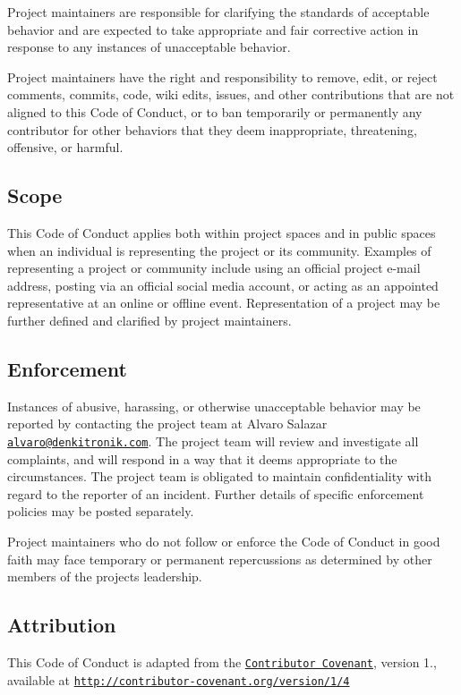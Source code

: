 Project maintainers are responsible for clarifying the standards of acceptable behavior and are expected to take appropriate and fair corrective action in response to any instances of unacceptable behavior.

Project maintainers have the right and responsibility to remove, edit, or reject comments, commits, code, wiki edits, issues, and other contributions that are not aligned to this Code of Conduct, or to ban temporarily or permanently any contributor for other behaviors that they deem inappropriate, threatening, offensive, or harmful.

\subsection*{Scope}

This Code of Conduct applies both within project spaces and in public spaces when an individual is representing the project or its community. Examples of representing a project or community include using an official project e-\/mail address, posting via an official social media account, or acting as an appointed representative at an online or offline event. Representation of a project may be further defined and clarified by project maintainers.

\subsection*{Enforcement}

Instances of abusive, harassing, or otherwise unacceptable behavior may be reported by contacting the project team at Alvaro Salazar \href{mailto:alvaro@denkitronik.com}{\tt alvaro@denkitronik.\+com}. The project team will review and investigate all complaints, and will respond in a way that it deems appropriate to the circumstances. The project team is obligated to maintain confidentiality with regard to the reporter of an incident. Further details of specific enforcement policies may be posted separately.

Project maintainers who do not follow or enforce the Code of Conduct in good faith may face temporary or permanent repercussions as determined by other members of the project\textquotesingle{}s leadership.

\subsection*{Attribution}

This Code of Conduct is adapted from the \href{http://contributor-covenant.org}{\tt Contributor Covenant}, version 1., available at \href{http://contributor-covenant.org/version/1/4/}{\tt http\+://contributor-\/covenant.\+org/version/1/4} 
